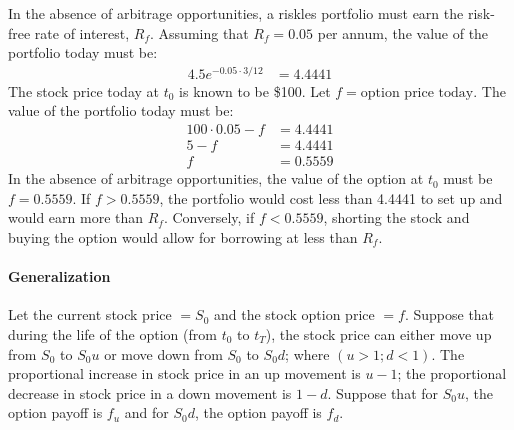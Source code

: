 \documentclass[12pt]{article}
\begin{document}
In the absence of arbitrage opportunities, a riskles portfolio must earn the risk-free rate of interest, $R_{f}$. Assuming that $R_{f}=0.05$ per annum, the value of the portfolio today must be:
\begin{align*}
4.5e^{-0.05\cdot3/12}&=4.4441
\end{align*}
The stock price today at $t_{0}$ is known to be \$100. Let $f=\text{option price today}$. The value of the portfolio today must be:
\begin{align*}
100\cdot0.05-f&=4.4441\\
5-f&=4.4441\\
f&=0.5559
\end{align*}
In the absence of arbitrage opportunities, the value of the option at $t_{0}$ must be $f=0.5559$. If $f>0.5559$, the portfolio would cost less than 4.4441 to set up and would earn more than $R_{f}$. Conversely, if $f<0.5559$, shorting the stock and buying the option would allow for borrowing at less than $R_{f}$.

\paragraph{Generalization} \hspace{0pt}

Let the current stock price $=S_{0}$ and the stock option price $=f$. Suppose that during the life of the option (from $t_{0}$ to $t_{T}$), the stock price can either move up from $S_{0}$ to $S_{0}u$ or move down from $S_{0}$ to $S_{0}d$; where $(u>1; d<1)$. The proportional increase in stock price in an up movement is $u-1$; the proportional decrease in stock price in a down movement is $1-d$. Suppose that for $S_{0}u$, the option payoff is $f_{u}$ and for $S_{0}d$, the option payoff is $f_{d}$.
\end{document}
